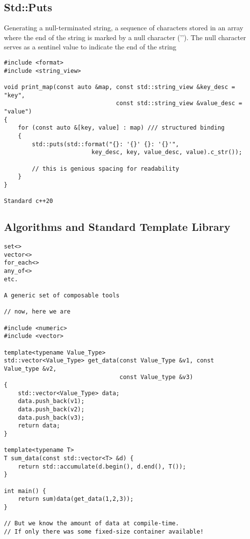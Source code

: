 \subsection{Std::Puts}

Generating a null-terminated string,  a sequence of characters stored in an array
where the end of the string is marked by a null character ('\0'). 
The null character serves as a sentinel value to indicate the end of the string

\begin{verbatim}
#include <format>
#include <string_view>

void print_map(const auto &map, const std::string_view &key_desc = "key",
                                const std::string_view &value_desc = "value")
{
    for (const auto &[key, value] : map) /// structured binding
    {
        std::puts(std::format("{}: '{}' {}: '{}'",
                         key_desc, key, value_desc, value).c_str());

        // this is genious spacing for readability
    }
}

Standard c++20
\end{verbatim}
\subsection{Algorithms and Standard Template Library}

\begin{verbatim}
set<>
vector<>
for_each<>
any_of<>
etc.

A generic set of composable tools

// now, here we are

#include <numeric>
#include <vector>

template<typename Value_Type>
std::vector<Value_Type> get_data(const Value_Type &v1, const Value_type &v2,
                                 const Value_type &v3)
{
    std::vector<Value_Type> data;
    data.push_back(v1);
    data.push_back(v2);
    data.push_back(v3);
    return data;
}

template<typename T>
T sum_data(const std::vector<T> &d) {
    return std::accumulate(d.begin(), d.end(), T());
}

int main() {
    return sum)data(get_data(1,2,3));
}

// But we know the amount of data at compile-time. 
// If only there was some fixed-size container available!

\end{verbatim}


